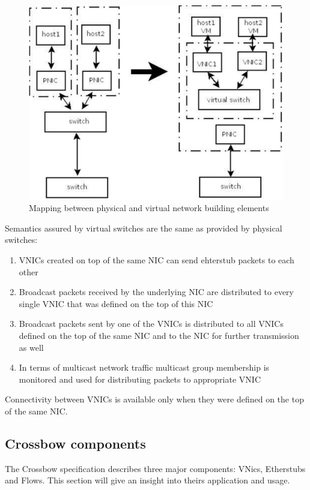 \documentclass[11pt]{book}
\begin{document}
			\begin{figure}[H]
				\begin{center}
          \includegraphics[width=.7\textwidth]{img/physical_and_virtual_switches_mapping.pdf}
				\end{center}

				\caption{Mapping between physical and virtual network building elements}
			\end{figure}
			
			Semantics assured by virtual switches are the same as provided by physical switches: 
			\begin{enumerate}
				\item{VNICs created on top of the same NIC can send ehterstub packets to each other}
				\item{Broadcast packets received by the underlying NIC are distributed to every single VNIC that was defined on the top of this NIC}
				\item{Broadcast packets sent by one of the VNICs is distributed to all VNICs defined on the top of the same NIC and to the NIC for further transmission as well}
				\item{In terms of multicast network traffic multicast group membership is monitored and used for distributing packets to appropriate VNIC}
			\end{enumerate}

			Connectivity between VNICs is available only when they were defined on the top of the same NIC. 

	
      \subsection{Crossbow components}

                The Crossbow specification describes three major components: VNics, Etherstubs and Flows. This section
                will give an insight into theirs application and usage.
                
\end{document}
